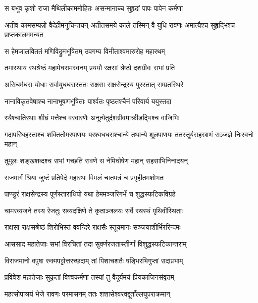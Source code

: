 
\twolineshloka
{स बभूव कृशो राजा मैथिलीकाममोहितः}
{असन्मानाच्च सुहृदां पापः पापेन कर्मणा} %

\threelineshloka
{अतीव कामसम्पन्नो वैदेहीमनुचिन्तयन्}
{अतीतसमये काले तस्मिन् वै युधि रावणः}
{अमात्यैश्च सुहृद्भिश्च प्राप्तकालममन्यत} %

\twolineshloka
{स हेमजालविततं मणिविद्रुमभूषितम्}
{उपगम्य विनीताश्वमारुरोह महारथम्} %

\twolineshloka
{तमास्थाय रथश्रेष्ठं महामेघसमस्वनम्}
{प्रययौ रक्षसां श्रेष्ठो दशग्रीवः सभां प्रति} %

\twolineshloka
{असिचर्मधरा योधाः सर्वायुधधरास्ततः}
{राक्षसा राक्षसेन्द्रस्य पुरस्तात् सम्प्रतस्थिरे} %

\twolineshloka
{नानाविकृतवेषाश्च नानाभूषणभूषिताः}
{पार्श्वतः पृष्ठतश्चैनं परिवार्य ययुस्तदा} %

\twolineshloka
{रथैश्चातिरथाः शीघ्रं मत्तैश्च वरवारणैः}
{अनूत्पेतुर्दशग्रीवमाक्रीडद्भिश्च वाजिभिः} %

\threelineshloka
{गदापरिघहस्ताश्च शक्तितोमरपाणयः}
{परश्वधधराश्चान्ये तथान्ये शूलपाणयः}
{ततस्तूर्यसहस्राणं सञ्जज्ञे निःस्वनो महान्} %

\twolineshloka
{तुमुलः शङ्खशब्दश्च सभां गच्छति रावणे}
{स नेमिघोषेण महान् सहसाभिनिनादयन्} %

\twolineshloka
{राजमार्गं श्रिया जुष्टं प्रतिपेदे महारथः}
{विमलं चातपत्रं च प्रगृहीतमशोभत} %

\twolineshloka
{पाण्डुरं राक्षसेन्द्रस्य पूर्णस्ताराधिपो यथा}
{हेममञ्जरिगर्भे च शुद्धस्फटिकविग्रहे} %

\twolineshloka
{चामरव्यजने तस्य रेजतुः सव्यदक्षिणे}
{ते कृताञ्जलयः सर्वे रथस्थं पृथिवीस्थिताः} %

\twolineshloka
{राक्षसा राक्षसश्रेष्ठं शिरोभिस्तं ववन्दिरे}
{राक्षसैः स्तूयमानः सञ्जयाशीर्भिररिन्दमः} %

\twolineshloka
{आससाद महातेजाः सभां विरचितां तदा}
{सुवर्णरजतास्तीर्णां विशुद्धस्फटिकान्तराम्} %

\twolineshloka
{विराजमानो वपुषा रुक्मपट्टोत्तरच्छदाम्}
{तां पिशाचशतैः षड्भिरभिगुप्तां सदाप्रभाम्} %

\twolineshloka
{प्रविवेश महातेजाः सुकृतां विश्वकर्मणा}
{तस्यां तु वैदूर्यमयं प्रियकाजिनसंवृतम्} %

\twolineshloka
{महत्सोपाश्रयं भेजे रावणः परमासनम्}
{ततः शशासेश्वरवद्दूताँल्लघुपराक्रमान्} %

